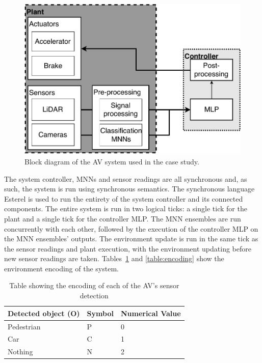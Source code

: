 \begin{figure}[h]
	\centering
	\includegraphics[scale=0.6]{Content/fig/AV-sys-nenf.pdf}
	\caption{Block diagram of the \ac{AV} system used in the case study. \label{fig:avnenf}}
\end{figure}

The system controller, \acp{MNN} and sensor readings are all synchronous and, as such, the system is run using synchronous semantics.
The synchronous language Esterel is used to run the entirety of the system controller and its connected components.
The entire system is run in two logical ticks: a single tick for the plant and a single tick for the controller \ac{MLP}.
The \ac{MNN} ensembles are run concurrently with each other, followed by the execution of the controller \ac{MLP} on the \ac{MNN} ensembles' outputs.
The environment update is run in the same tick as the sensor readings and plant execution, with the environment updating before new sensor readings are taken.
Tables~\ref{table:objects} and \ref{table:encoding} show the environment encoding of the system.

\begin{table}[h]
	\centering
	\caption{Table showing the encoding of each of the \ac{AV}'s sensor detection}
	\label{table:objects}
	\begin{tabular}{@{}|l|l|l|@{}}
		\hline
		Detected object (O) & Symbol & Numerical Value \\ \hline
		Pedestrian & P & 0 \\
		Car & C & 1 \\
		Nothing & N & 2 \\
		\hline
	\end{tabular}
\end{table}

